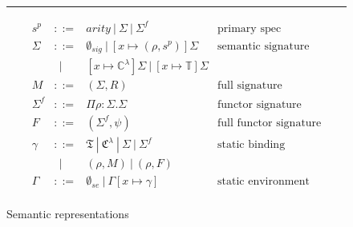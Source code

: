 \begin{figure}
	\hrule
\[\begin{array}{rcll}
       s^p & ::= &  arity~|~\Sigma~|~\Sigma^f& \textrm{primary spec}\\
       \Sigma & ::= & \emptyset_{sig}~|~[x\mapsto (\rho,
       s^p)]\Sigma & \textrm{semantic signature}\\
       & ~~| & [x\mapsto \mathbb{C}^\lambda]\Sigma~|~[x\mapsto
       \mathbb{T}]\Sigma \\ 
	M & ::= & (\Sigma, R) & \textrm{full signature}\\
        \Sigma^f & ::= & \Pi\rho:\Sigma.\Sigma & \textrm{functor signature}\\
	F & ::= & (\Sigma^f, \psi) & \textrm{full functor signature}\\
        \gamma & ::= &
        \mathfrak{T}~|~\mathfrak{C}^\lambda~|~\Sigma~|~\Sigma^f & \textrm{static binding}\\
        & ~~| & (\rho, M)~|~(\rho,
        F) \\
	\Gamma & ::= & \emptyset_{se}~|~\Gamma[x\mapsto \gamma] &
        \textrm{static environment}\\
\end{array}\]
\caption{Semantic representations}
\label{fig:semanticobjs}
\end{figure}